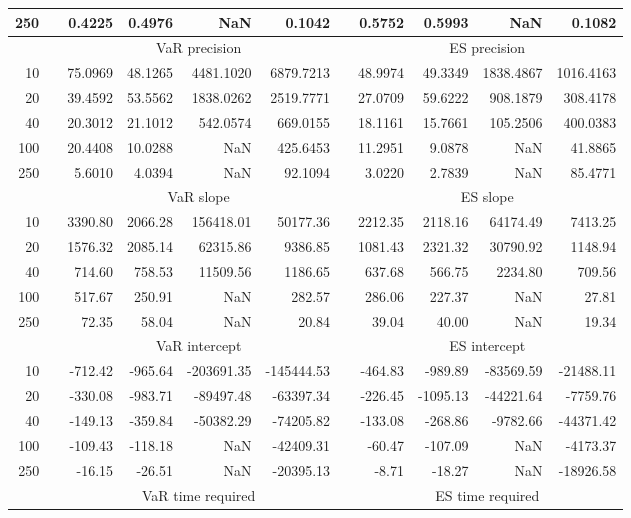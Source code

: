 {{\begin{longtable}{rr rrrr r rrrr}
250 && 0.4225  & 0.4976  &    NaN & 0.1042 && 0.5752  & 0.5993  &    NaN & 0.1082 \\ 
\hline 
 & & \multicolumn{4}{c}{VaR precision} &&  \multicolumn{4}{c}{ES precision} \\ \cline{3-6}  \cline{8-11}
10 && 75.0969 & 48.1265 & 4481.1020 & 6879.7213 & & 48.9974 & 49.3349 & 1838.4867 & 1016.4163 \\ 
20 && 39.4592 & 53.5562 & 1838.0262 & 2519.7771 & & 27.0709 & 59.6222 & 908.1879 & 308.4178 \\ 
40 && 20.3012 & 21.1012 & 542.0574 & 669.0155 & & 18.1161 & 15.7661 & 105.2506 & 400.0383 \\ 
100 && 20.4408 & 10.0288 &    NaN & 425.6453 & & 11.2951 & 9.0878 &    NaN & 41.8865 \\ 
250 && 5.6010 & 4.0394 &    NaN & 92.1094 & & 3.0220 & 2.7839 &    NaN & 85.4771 \\ 
\hline 
 & & \multicolumn{4}{c}{ VaR slope} && \multicolumn{4}{c}{ES slope} \\ \cline{3-6}  \cline{8-11}
10 && 3390.80 & 2066.28 & 156418.01 & 50177.36 && 2212.35 & 2118.16 & 64174.49 & 7413.25 \\ 
20 && 1576.32 & 2085.14 & 62315.86 & 9386.85 && 1081.43 & 2321.32 & 30790.92 & 1148.94 \\ 
40 && 714.60 & 758.53 & 11509.56 & 1186.65 && 637.68 & 566.75 & 2234.80 & 709.56 \\ 
100 && 517.67 & 250.91 &  NaN & 282.57 && 286.06 & 227.37 &  NaN & 27.81 \\ 
250 && 72.35 & 58.04 &  NaN & 20.84 && 39.04 & 40.00 &  NaN & 19.34 \\ 
\hline 
 & & \multicolumn{4}{c}{ VaR intercept} &&  \multicolumn{4}{c}{ES intercept} \\ \cline{3-6}  \cline{8-11}
10 && -712.42 & -965.64 & -203691.35 & -145444.53 && -464.83 & -989.89 & -83569.59 & -21488.11 \\ 
20 && -330.08 & -983.71 & -89497.48 & -63397.34 && -226.45 & -1095.13 & -44221.64 & -7759.76 \\ 
40 && -149.13 & -359.84 & -50382.29 & -74205.82 && -133.08 & -268.86 & -9782.66 & -44371.42 \\ 
100 && -109.43 & -118.18 &  NaN & -42409.31 && -60.47 & -107.09 &  NaN & -4173.37 \\ 
250 && -16.15 & -26.51 &  NaN & -20395.13 && -8.71 & -18.27 &  NaN & -18926.58 \\ 
\hline 
 & & \multicolumn{4}{c}{VaR time required} && \multicolumn{4}{c}{ES time required} \\ \cline{3-6}  \cline{8-11}

\end{longtable}}}
